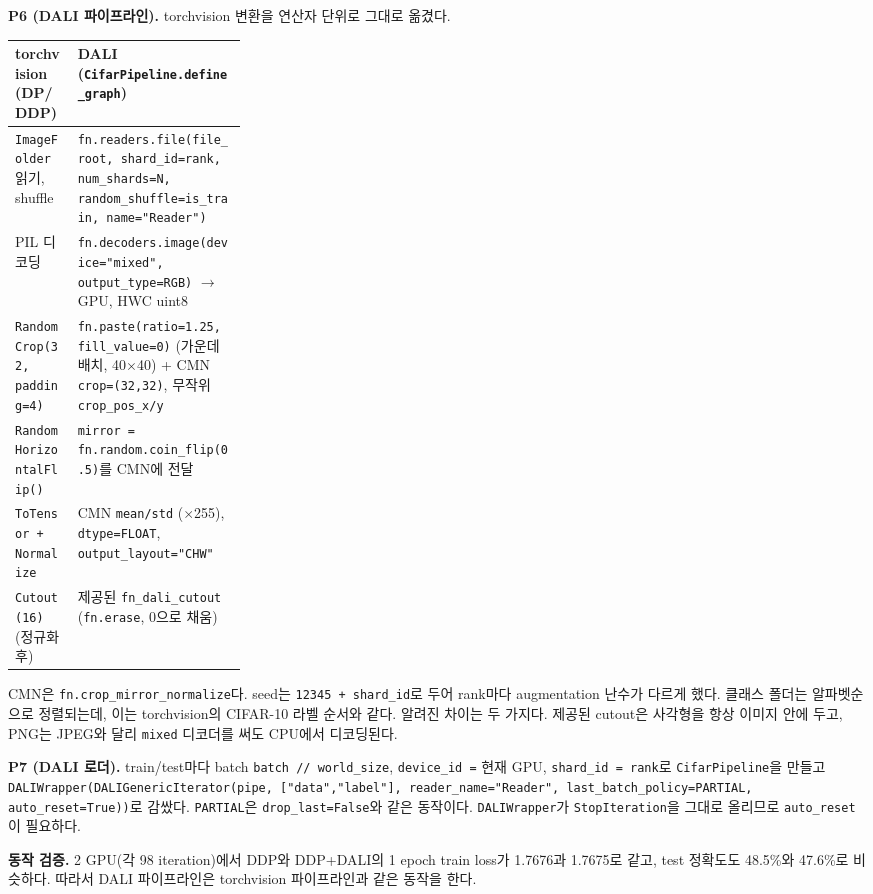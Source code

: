 \documentclass[11pt,a4paper]{article}
\begin{document}
\textbf{P6 (DALI 파이프라인).} torchvision 변환을 연산자 단위로 그대로 옮겼다.
\begin{center}\footnotesize
\begin{tabularx}{\linewidth}{@{}>{\raggedright\arraybackslash}p{0.27\linewidth}>{\raggedright\arraybackslash}X@{}}
\toprule
torchvision (DP/DDP) & DALI (\texttt{CifarPipeline.define\_graph}) \\
\midrule
\texttt{ImageFolder} 읽기, shuffle & \texttt{fn.readers.file(file\_root, shard\_id=rank, num\_shards=N,} \texttt{random\_shuffle=is\_train, name="Reader")} \\
PIL 디코딩 & \texttt{fn.decoders.image(device="mixed", output\_type=RGB)} $\rightarrow$ GPU, HWC uint8 \\
\texttt{RandomCrop(32, padding=4)} & \texttt{fn.paste(ratio=1.25, fill\_value=0)} (가운데 배치, 40$\times$40) + CMN \texttt{crop=(32,32)}, 무작위 \texttt{crop\_pos\_x/y} \\
\texttt{RandomHorizontalFlip()} & \texttt{mirror = fn.random.coin\_flip(0.5)}를 CMN에 전달 \\
\texttt{ToTensor + Normalize} & CMN \texttt{mean/std} ($\times$255), \texttt{dtype=FLOAT}, \texttt{output\_layout="CHW"} \\
\texttt{Cutout(16)} (정규화 후) & 제공된 \texttt{fn\_dali\_cutout} (\texttt{fn.erase}, 0으로 채움) \\
\bottomrule
\end{tabularx}
\end{center}
CMN은 \texttt{fn.crop\_mirror\_normalize}다. seed는 \texttt{12345 + shard\_id}로 두어 rank마다 augmentation 난수가 다르게 했다. 클래스 폴더는
알파벳순으로 정렬되는데, 이는 torchvision의 CIFAR-10 라벨 순서와 같다. 알려진 차이는 두 가지다. 제공된 cutout은 사각형을 항상 이미지 안에 두고,
PNG는 JPEG와 달리 \texttt{mixed} 디코더를 써도 CPU에서 디코딩된다.

\textbf{P7 (DALI 로더).} train/test마다 batch \texttt{batch // world\_size}, \texttt{device\_id =} 현재 GPU, \texttt{shard\_id = rank}로
\texttt{CifarPipeline}을 만들고 \texttt{DALIWrapper(DALIGenericIterator(pipe, ["data","label"], reader\_name="Reader", last\_batch\_policy=PARTIAL,
auto\_reset=True))}로 감쌌다. \texttt{PARTIAL}은 \texttt{drop\_last=False}와 같은 동작이다. \texttt{DALIWrapper}가 \texttt{StopIteration}을 그대로 올리므로
\texttt{auto\_reset}이 필요하다.

\textbf{동작 검증.} 2 GPU(각 98 iteration)에서 DDP와 DDP+DALI의 1 epoch train loss가 1.7676과 1.7675로 같고, test 정확도도 48.5\%와
47.6\%로 비슷하다. 따라서 DALI 파이프라인은 torchvision 파이프라인과 같은 동작을 한다.
\end{document}
